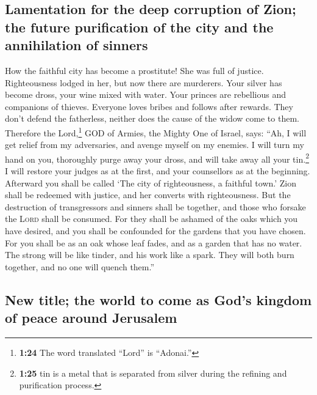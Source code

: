 \hypertarget{lamentation-for-the-deep-corruption-of-zion-the-future-purification-of-the-city-and-the-annihilation-of-sinners}{%
\subsection{Lamentation for the deep corruption of Zion; the future
purification of the city and the annihilation of
sinners}\label{lamentation-for-the-deep-corruption-of-zion-the-future-purification-of-the-city-and-the-annihilation-of-sinners}}

 How the faithful city has become a prostitute! She was
full of justice. Righteousness lodged in her, but now there are
murderers.  Your silver has become dross, your wine mixed
with water.  Your princes are rebellious and companions
of thieves. Everyone loves bribes and follows after rewards. They don't
defend the fatherless, neither does the cause of the widow come to them.
 Therefore the Lord,\footnote{\textbf{1:24} The word
  translated ``Lord'' is ``Adonai.''} GOD of Armies, the Mighty One of
Israel, says: ``Ah, I will get relief from my adversaries, and avenge
myself on my enemies.  I will turn my hand on you,
thoroughly purge away your dross, and will take away all your
tin.\footnote{\textbf{1:25} tin is a metal that is separated from silver
  during the refining and purification process.}  I will
restore your judges as at the first, and your counsellors as at the
beginning. Afterward you shall be called `The city of righteousness, a
faithful town.'  Zion shall be redeemed with justice, and
her converts with righteousness.  But the destruction of
transgressors and sinners shall be together, and those who forsake the
\textsc{Lord} shall be consumed.  For they shall be
ashamed of the oaks which you have desired, and you shall be confounded
for the gardens that you have chosen.  For you shall be
as an oak whose leaf fades, and as a garden that has no water.
 The strong will be like tinder, and his work like a
spark. They will both burn together, and no one will quench them.''

\hypertarget{new-title-the-world-to-come-as-gods-kingdom-of-peace-around-jerusalem}{%
\subsection{New title; the world to come as God's kingdom of peace
around
Jerusalem}\label{new-title-the-world-to-come-as-gods-kingdom-of-peace-around-jerusalem}}

